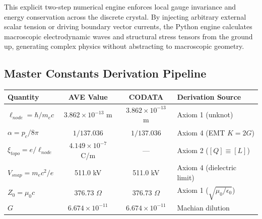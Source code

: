 This explicit two-step numerical engine enforces local gauge invariance and energy conservation across the discrete crystal. By injecting arbitrary external scalar tension or driving boundary vector currents, the Python engine calculates macroscopic electrodynamic waves and structural stress tensors from the ground up, generating complex physics without abstracting to macroscopic geometry.

\subsection*{Master Constants Derivation Pipeline}
\begin{center}
\small
\renewcommand{\arraystretch}{1.2}
\begin{tabular}{lccl}
\toprule
\textbf{Quantity} & \textbf{AVE Value} & \textbf{CODATA} & \textbf{Derivation Source} \\
\midrule
$\ell_{node} = \hbar/m_e c$ & $3.862 \times 10^{-13}$ m & $3.862 \times 10^{-13}$ m & Axiom 1 (unknot) \\
$\alpha = p_c/8\pi$ & $1/137.036$ & $1/137.036$ & Axiom 4 (EMT $K=2G$) \\
$\xi_{topo} = e/\ell_{node}$ & $4.149 \times 10^{-7}$ C/m & --- & Axiom 2 ($[Q]\equiv[L]$) \\
$V_{snap} = m_e c^2/e$ & 511.0 kV & 511.0 kV & Axiom 4 (dielectric limit) \\
$Z_0 = \mu_0 c$ & 376.73 $\Omega$ & 376.73 $\Omega$ & Axiom 1 ($\sqrt{\mu_0/\epsilon_0}$) \\
$G$ & $6.674 \times 10^{-11}$ & $6.674 \times 10^{-11}$ & Machian dilution \\
\bottomrule
\end{tabular}
\end{center}